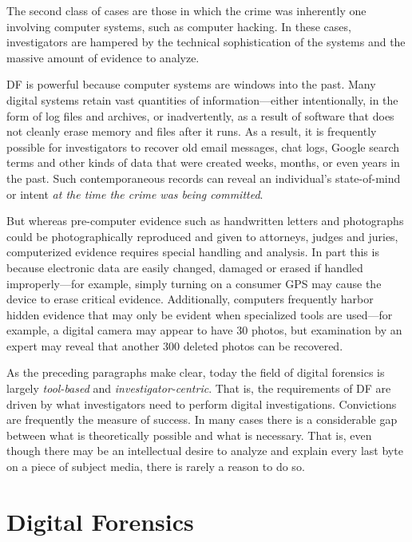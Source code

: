 \documentclass[11pt,letter]{article}
\begin{document}
The second class of cases are those in
which the crime was inherently one involving computer systems, such as
computer hacking. In these cases, investigators are hampered
by the technical sophistication of the systems and the massive amount
of evidence to analyze.

DF is powerful because computer systems are windows into the
past. Many digital systems retain vast quantities of
information---either intentionally, in the form of log files and
archives, or inadvertently, as a result of software that does not
cleanly erase memory and files after it runs. As a result, it
is frequently possible for investigators to recover old email
messages, chat logs,   Google search terms and other kinds of data
that were created
weeks, months, or even years in the past. Such contemporaneous records
can reveal an individual's state-of-mind or intent \emph{at the time
  the crime was being committed}.

But whereas pre-computer evidence such as handwritten letters and
photographs could be photographically reproduced and given to attorneys, judges and juries, computerized evidence
requires special handling and analysis. In part this is because
electronic data are easily changed, damaged or erased if
handled improperly---for example, simply turning on a consumer GPS
may cause the device to erase critical evidence. Additionally,  computers
frequently harbor hidden evidence that may only be evident when
specialized tools are used---for example, a digital camera may appear to have
30 photos, but examination by an expert may reveal that another 300
deleted photos can be recovered.

As the preceding paragraphs make clear, today the field of digital
forensics is largely \emph{tool-based} and
\emph{investigator-centric}. 
That is, the requirements of DF are driven 
by what investigators need to perform digital
investigations\citep{walls-levine-effective-digital-forensics}. Convictions
are frequently the
measure of success. In many cases there is a considerable gap between
what is theoretically possible and what is necessary. That is, even
though there may be an intellectual desire to analyze and explain every last byte
on a piece of subject media\cite{garfinkel:every-last-byte}, there is
rarely a reason to do so.

\section{Digital Forensics}
\end{document}
